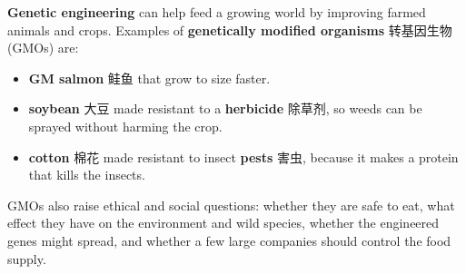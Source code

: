 \documentclass[11pt]{article}
\begin{document}
\textbf{Genetic engineering} can help feed a growing world by improving farmed animals and crops. Examples of \textbf{genetically modified organisms} 转基因生物 (GMOs) are:

\begin{itemize}
\item \textbf{GM salmon} 鲑鱼 that grow to size faster.

\item \textbf{soybean} 大豆 made resistant to a \textbf{herbicide} 除草剂, so weeds can be sprayed without harming the crop.

\item \textbf{cotton} 棉花 made resistant to insect \textbf{pests} 害虫, because it makes a protein that kills the insects.

\end{itemize}

GMOs also raise ethical and social questions: whether they are safe to eat, what effect they have on the environment and wild species, whether the engineered genes might spread, and whether a few large companies should control the food supply.
\end{document}
